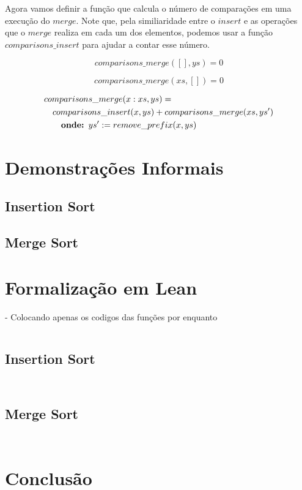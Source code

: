 \documentclass[12pt, oneside, a4paper,english,brazil]{abntex2}
\begin{document}
\qquad Agora vamos definir a fun\c{c}\~ao que calcula o n\'umero de compara\c{c}\~oes em uma execu\c{c}\~ao
do $merge$. Note que, pela similiaridade entre
o $insert$ e as opera\c{c}\~oes que o $merge$ realiza em cada um dos elementos,
podemos usar a fun\c{c}\~ao $comparisons\_insert$ para ajudar a contar esse n\'umero.

\begin{equation}
  comparisons\_merge([], ys) = 0
\end{equation}

\begin{equation}
  comparisons\_merge(xs, []) = 0
\end{equation}

\begin{equation}
\begin{split}
  &comparisons\_merge(x : xs, ys) = \\
  &\text{\quad} comparisons\_insert(x, ys) + comparisons\_merge(xs, ys') \\
  &\text{\qquad\textbf{onde: }} ys' := remove\_prefix(x, ys)
\end{split}
\end{equation}

\chapter{Demonstra\c{c}\~oes Informais}
\section{Insertion Sort}
\section{Merge Sort}

\chapter{Formaliza\c{c}\~ao em Lean}
- Colocando apenas os codigos das fun\c{c}\~oes por enquanto

\inputminted{lean}{declarations.lean}
\section{Insertion Sort}
\inputminted{lean}{insertion_sort.lean}
\inputminted{lean}{insertion_sort_modified.lean}

\section{Merge Sort}

\inputminted{lean}{merge_sort.lean}
\inputminted{lean}{merge_sort_modified.lean}

\chapter{Conclus\~ao}

\postextual

% 

\end{document}
